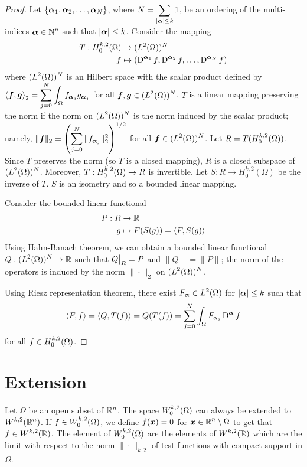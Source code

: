 \begin{proof}
Let $\displaystyle \left\{ {\bm{\alpha}}_1, {\bm{\alpha}}_2, \ldots,
{\bm{\alpha}}_N \right\}$,
where $\displaystyle N = \sum_{|{\bm{\alpha}}|\leq k} 1$, be an ordering of
the multi-indices $\displaystyle {\bm{\alpha}} \in \mathbb{N}^n$ such that
$|{\bm{\alpha}}|\leq k$.
Consider the mapping
\begin{align*}
T: H^{k,2}_0(\Omega) & \rightarrow (L^2(\Omega))^N \\
f &\mapsto \left( \operatorname{D}^{{\bm{\alpha}}_1} f , \operatorname{D}^{{\bm{\alpha}}_2} f, \ldots,
\operatorname{D}^{{\bm{\alpha}}_N} f \right)
\end{align*}
where $\displaystyle (L^2(\Omega))^N$ is an Hilbert space with the
scalar product defined by
$\displaystyle \left\langle{{\bm{f}}} , {{\bm{g}}}\right\rangle_2 =
\sum_{j=0}^N \int_\Omega f_{{\bm{\alpha}}_j} g_{{\bm{\alpha}}_j}$
for all $\displaystyle {\bm{f}}, {\bm{g}} \in (L^2(\Omega))^N$.
$T$ is a linear mapping preserving the norm if the norm on
$\displaystyle (L^2(\Omega))^N$ is the norm induced by the scalar
product; namely,
$\displaystyle \| {\bm{f}} \|_2 =
\left( \sum_{j=0}^N \| f_{{\bm{\alpha}}_j} \|_2^2 \right)^{1/2}$
for all $\displaystyle {\bm{f}} \in (L^2(\Omega))^N$.
Let $\displaystyle R = T(H^{k,2}_0(\Omega))$.  Since $T$ preserves the
norm (so $T$ is a closed mapping), $R$ is a closed subspace of
$\displaystyle (L^2(\Omega))^N$.  Moreover,
$\displaystyle T:H^{k,2}_0(\Omega) \rightarrow R$ is invertible.  Let
$S:R\rightarrow H^{k,2}_0(\Omega)$ be the inverse of $T$.  $S$ is
an isometry and so a bounded linear mapping.

Consider the bounded linear functional
\begin{align*}
P:R &\rightarrow \mathbb{R} \\
g &\mapsto  F(S(g)) = \left\langle{F} , {S(g)}\right\rangle
\end{align*}
Using Hahn-Banach theorem, we can obtain a bounded linear functional
$\displaystyle Q: (L^2(\Omega))^N \rightarrow \mathbb{R}$ such that
$\displaystyle Q\big|_R = P$ and $\|Q\| = \|P\|$; the norm of the
operators is induced by the norm $\|\cdot\|_2$ on
$\displaystyle (L^2(\Omega))^N$.

Using Riesz representation theorem, there exist
$\displaystyle F_{{\bm{\alpha}}} \in L^2(\Omega)$ for
$|{\bm{\alpha}}|\leq k$ such that
\[
\left\langle{F} , {f}\right\rangle = \left\langle{Q} , {T(f)}\right\rangle = Q(T(f))
= \sum_{j=0}^N \int_\Omega F_{\alpha_j} \operatorname{D}^{{\bm{\alpha}}} f 
\]
for all $\displaystyle f \in H^{k,2}_0(\Omega)$.
\end{proof}

\section{Extension}

Let $\Omega$ be an open subset of $\displaystyle \mathbb{R}^n$.  The space
$\displaystyle W_0^{k,2}(\Omega)$ can always be extended to
$\displaystyle W^{k,2}(\mathbb{R}^n)$.  If 
$\displaystyle f\in W_0^{k,2}(\Omega)$, we define $f({\bm{x}}) =0$ for
$\displaystyle {\bm{x}} \in \mathbb{R}^n\setminus \Omega$ to get that
 $\displaystyle f \in W^{k,2}(\mathbb{R})$.
The element of $\displaystyle W_0^{k,2}(\Omega)$ are the elements of
$\displaystyle W^{k,2}(\mathbb{R})$
which are the limit with respect to the norm $\|\cdot\|_{k,2}$ of test
functions with compact support in $\Omega$.

